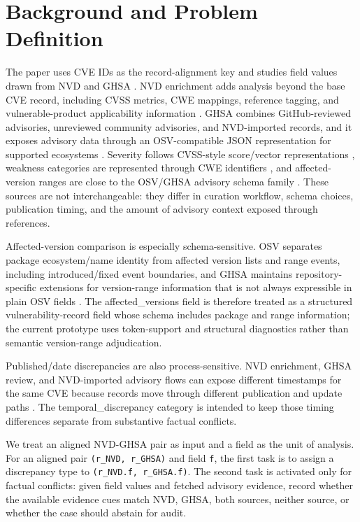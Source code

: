 \section{Background and Problem Definition}

The paper uses CVE IDs as the record-alignment key \cite{CVE2026} and studies field values drawn from NVD \cite{NVDAPI2026} and GHSA \cite{GHSA2026}. NVD enrichment adds analysis beyond the base CVE record, including CVSS metrics, CWE mappings, reference tagging, and vulnerable-product applicability information \cite{NVDProcess2026,NVDStatus2026}. GHSA combines GitHub-reviewed advisories, unreviewed community advisories, and NVD-imported records, and it exposes advisory data through an OSV-compatible JSON representation for supported ecosystems \cite{GHSAAbout2026,GHSARepo2026}. Severity follows CVSS-style score/vector representations \cite{CVSS31}, weakness categories are represented through CWE identifiers \cite{CWE2026}, and affected-version ranges are close to the OSV/GHSA advisory schema family \cite{OSVSchema2026}. These sources are not interchangeable: they differ in curation workflow, schema choices, publication timing, and the amount of advisory context exposed through references.

Affected-version comparison is especially schema-sensitive. OSV separates package ecosystem/name identity from affected version lists and range events, including introduced/fixed event boundaries, and GHSA maintains repository-specific extensions for version-range information that is not always expressible in plain OSV fields \cite{OSVSchema2026,GHSARepo2026}. The affected\_versions field is therefore treated as a structured vulnerability-record field whose schema includes package and range information; the current prototype uses token-support and structural diagnostics rather than semantic version-range adjudication.

Published/date discrepancies are also process-sensitive. NVD enrichment, GHSA review, and NVD-imported advisory flows can expose different timestamps for the same CVE because records move through different publication and update paths \cite{NVDProcess2026,NVDOperations2026,Segal2026GHSA}. The temporal\_discrepancy category is intended to keep those timing differences separate from substantive factual conflicts.

We treat an aligned NVD-GHSA pair as input and a field as the unit of analysis. For an aligned pair \texttt{(r\_NVD, r\_GHSA)} and field \texttt{f}, the first task is to assign a discrepancy type to \texttt{(r\_NVD.f, r\_GHSA.f)}. The second task is activated only for factual conflicts: given field values and fetched advisory evidence, record whether the available evidence cues match NVD, GHSA, both sources, neither source, or whether the case should abstain for audit.

